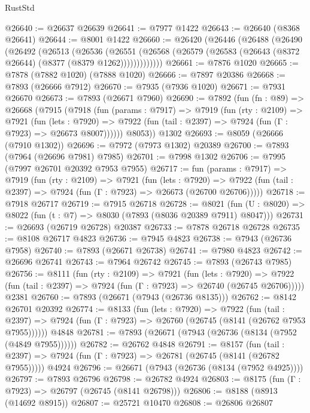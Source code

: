 \begin{lexlean}{RustStd}
\begin{coremodule}
@26640 := @26637 @26639
@26641 := @7977 @1422
@26643 := @26640 (@8368 @26641)
@26644 := @8001 @1422
@26660 := @26420
    (@26446
      (@26488
        (@26490
          (@26492
            (@26513
              (@26536
                (@26551
                  (@26568 (@26579 (@26583 (@26643 (@8372 @26644) (@8377 (@8379 @1262)))))))))))))
@26661 := @7876 @1020
@26665 := @7878 (@7882 @1020) (@7888 @1020)
@26666 := @7897 @20386
@26668 := @7893 (@26666 @7912)
@26670 := @7935 (@7936 @1020)
@26671 := @7931 @26670
@26673 := @7893 (@26671 @7960)
@26690 := @7892
    (fun (fn : @89) =>
    @26668
      (@7915
        (@7918
          (fun (params : @7917) =>
          @7919
            (fun (rty : @2109) =>
            @7921
              (fun (lets : @7920) =>
              @7922 (fun (tail : @2397) => @7924 (fun (Γ : @7923) => @26673 @8007))))))
        @8053))
    @1302
@26693 := @8059 (@26666 (@7910 @1302))
@26696 := @7972 (@7973 @1302) @20389
@26700 := @7893 (@7964 (@26696 @7981) @7985)
@26701 := @7998 @1302
@26706 := @7995 (@7997 @26701 @20392 @7953 @7955)
@26717 := fun (params : @7917) =>
  @7919
    (fun (rty : @2109) =>
    @7921
      (fun (lets : @7920) =>
      @7922 (fun (tail : @2397) => @7924 (fun (Γ : @7923) => @26673 (@26700 @26706)))))
@26718 := @7918 @26717
@26719 := @7915 @26718
@26728 := @8021
    (fun (U : @8020) => @8022 (fun (t : @7) => @8030 (@7893 (@8036 @20389 @7911) @8047)))
@26731 := @26693 (@26719 @26728) @20387
@26733 := @7878 @26718 @26728
@26735 := @8108 @26717 @4823
@26736 := @7945 @4823
@26738 := @7943 (@26736 @7958)
@26740 := @7893 (@26671 @26738)
@26741 := @7980 @4823
@26742 := @26696 @26741
@26743 := @7964 @26742
@26745 := @7893 (@26743 @7985)
@26756 := @8111
    (fun (rty : @2109) =>
    @7921
      (fun (lets : @7920) =>
      @7922 (fun (tail : @2397) => @7924 (fun (Γ : @7923) => @26740 (@26745 @26706)))))
    @2381
@26760 := @7893 (@26671 (@7943 (@26736 @8135)))
@26762 := @8142 @26701 @20392
@26774 := @8133
    (fun (lets : @7920) =>
    @7922
      (fun (tail : @2397) =>
      @7924 (fun (Γ : @7923) => @26760 (@26745 (@8141 (@26762 @7953 @7955))))))
    @4848
@26781 := @7893 (@26671 (@7943 (@26736 (@8134 (@7952 (@4849 @7955))))))
@26782 := @26762 @4848
@26791 := @8157
    (fun (tail : @2397) => @7924 (fun (Γ : @7923) => @26781 (@26745 (@8141 (@26782 @7955)))))
    @4924
@26796 := @26671 (@7943 (@26736 (@8134 (@7952 @4925))))
@26797 := @7893 @26796
@26798 := @26782 @4924
@26803 := @8175 (fun (Γ : @7923) => @26797 (@26745 (@8141 @26798)))
@26806 := @8188 (@8913 (@14692 @8915))
@26807 := @25721 @10470
@26808 := @26806 @26807

\end{coremodule}
\end{lexlean}
